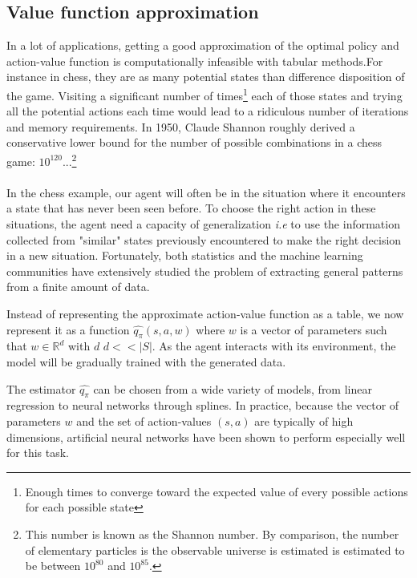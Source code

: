 \documentclass[11pt, onecolumn, a4paper]{report}
\begin{document}
\subsection{Value function approximation}


In a lot of applications, getting a good approximation of the optimal policy and action-value function is computationally infeasible with tabular methods.For instance in chess, they are as many potential states than difference disposition of the game.
Visiting a significant number of times\footnote{Enough times to converge toward the expected value of every possible actions for each possible state} each of those states and trying all the potential actions each time would lead to a ridiculous number of iterations and memory requirements. In 1950, Claude Shannon roughly derived a conservative lower bound for the number of possible combinations in a chess game: $10^{120}$...\footnote{This number is known as the Shannon number.  By comparison, the number of elementary particles is the observable universe is estimated is estimated to be between  $10^80$ and $10^85$.}\\\\

In the chess example, our agent will often be in the situation where it encounters a state that has never been seen before. To choose the right action in these situations, the agent need a capacity of generalization \textit{i.e} to use the information collected from "similar" states previously encountered to make the right decision in a new situation. Fortunately, both statistics and the machine learning communities have extensively studied the problem of extracting general patterns from a finite amount of data.

Instead of representing the approximate action-value function as a table, we now represent it as a function $\hat{q_\pi}(s,a,w)$ where $w$ is a vector of parameters such that $w\in \mathbb{R}^d$ with $d$ \textbf{$d<<|S|$}. As the agent interacts with its environment, the model will be gradually trained with the generated data.

The estimator $\hat{q_\pi}$ can be chosen from a wide variety of models, from linear regression to neural networks through splines. In practice, because the vector of parameters $w$ and the set of action-values $(s,a)$ are typically of high dimensions, artificial neural networks have been shown to perform especially well for this task.
\end{document}
